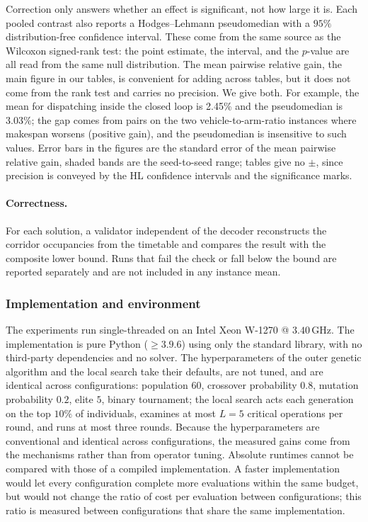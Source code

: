 \documentclass[manuscript,screen,review]{acmart}
\newcommand{\GainProbeLoop}{2.45\%}      %
\newcommand{\HLProbeLoop}{3.03\%}
\begin{document}
Correction only answers whether an effect is significant, not how large it is. Each pooled contrast also reports a Hodges--Lehmann pseudomedian with a $95\%$ distribution-free confidence interval. These come from the same source as the Wilcoxon signed-rank test: the point estimate, the interval, and the $p$-value are all read from the same null distribution.
The mean pairwise relative gain, the main figure in our tables, is convenient for adding across tables, but it does not come from the rank test and carries no precision.
We give both. For example, the mean for dispatching inside the closed loop is \GainProbeLoop{} and the pseudomedian is \HLProbeLoop{}; the gap comes from pairs on the two vehicle-to-arm-ratio instances where makespan worsens (positive gain), and the pseudomedian is insensitive to such values.
Error bars in the figures are the standard error of the mean pairwise relative gain, shaded bands are the seed-to-seed range; tables give no $\pm$, since precision is conveyed by the HL confidence intervals and the significance marks.

\paragraph{Correctness.}
For each solution, a validator independent of the decoder reconstructs the corridor occupancies from the timetable and compares the result with the composite lower bound.
Runs that fail the check or fall below the bound are reported separately and are not included in any instance mean.

\subsubsection{Implementation and environment}
\label{sec:impl}
The experiments run single-threaded on an Intel Xeon W-1270 @ $3.40$\,GHz. The implementation is pure Python ($\ge 3.9.6$) using only the standard library, with no third-party dependencies and no solver.
The hyperparameters of the outer genetic algorithm and the local search take their defaults, are not tuned, and are identical across configurations: population $60$, crossover probability $0.8$, mutation probability $0.2$, elite $5$, binary tournament; the local search acts each generation on the top $10\%$ of individuals, examines at most $L=5$ critical operations per round, and runs at most three rounds.
Because the hyperparameters are conventional and identical across configurations, the measured gains come from the mechanisms rather than from operator tuning.
Absolute runtimes cannot be compared with those of a compiled implementation. A faster implementation would let every configuration complete more evaluations within the same budget, but would not change the ratio of cost per evaluation between configurations; this ratio is measured between configurations that share the same implementation.
\end{document}
